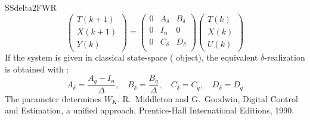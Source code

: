 \begin{command}{SSdelta2FWR}
\begin{equation}
\begin{pmatrix}
T(k+1)\\
X(k+1)\\
Y(k)
\end{pmatrix}
=
\begin{pmatrix}
0 & A_\delta & B_\delta\\
0 & I_{n} & 0\\
0 & C_\delta & D_\delta\\
\end{pmatrix}
\begin{pmatrix}
T(k)\\
X(k)\\
U(k)
\end{pmatrix}
\end{equation}
If the system is given in classical state-space ( object), the equivalent $\delta$-realization is obtained with :
\begin{equation}
A_\delta = \frac{A_q-I_n}{\Delta}, \quad B_\delta = \frac{B_q}{\Delta}, \quad C_\delta=C_q, \quad D_\delta = D_q
\end{equation}
The  parameter determines $W_K$.
\cite{Midd90a} R.~Middleton and G.~Goodwin, Digital Control and
Estimation, a unified approach, Prentice-Hall International Editions, 1990.
\end{command}


